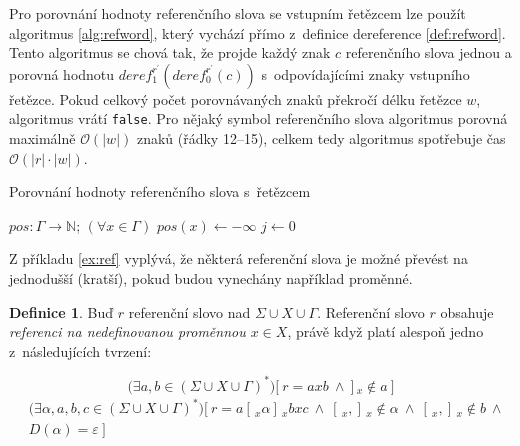 \documentclass[thesis=B,czech]{FITthesis}[2019/12/23]
\theoremstyle{definition}
\newtheorem{definition}{Definice}[chapter]
\begin{document}
Pro porovnání hodnoty referenčního slova se vstupním řetězcem lze použít algoritmus \ref{alg:refword}, který vychází přímo z~definice dereference \ref{def:refword}. Tento algoritmus se chová tak, že projde každý znak $c$ referenčního slova jednou a porovná hodnotu $deref_1^{r^\prime}  \left( deref_0^{r^\prime}  \left( c \right) \right)$ s~odpovídajícími znaky vstupního řetězce. Pokud celkový počet porovnávaných znaků překročí délku řetězce $w$, algoritmus vrátí \texttt{false}. Pro nějaký symbol referenčního slova algoritmus porovná maximálně $\mathcal{O}(|w|)$ znaků (řádky 12--15), celkem tedy algoritmus spotřebuje čas  $\mathcal{O}(|r|\cdot|w|)$. 

\begin{algorithm}
		
  \caption{Porovnání hodnoty referenčního slova s~řetězcem}\label{alg:refword}
	\DontPrintSemicolon
    $pos : \Gamma \rightarrow \mathbb{N}$; $(\forall x \in \Gamma)$ $pos(x) \gets -\infty$\;
    $j \gets 0$

  
\end{algorithm}


Z příkladu \ref{ex:ref} vyplývá, že některá referenční slova je možné převést na jednodušší (kratší), pokud budou vynechány například  proměnné. 

\begin{definition}
Buď $r$ referenční slovo nad ${\Sigma \cup X \cup \Gamma}$. Referenční slovo $r$ obsahuje \emph{referenci na nedefinovanou proměnnou $x \in X$}, právě když platí alespoň jedno z~následujících tvrzení:

	\begin{equation}\label{eq:ref1}\bigg (\exists  a, b \in \left(\Sigma \cup X \cup \Gamma\right)^\ast\bigg) \bigg [ \ r = a x b \ \wedge \ ]\,_x \notin a \ \bigg ]\end{equation}
	\begin{equation}\begin{split}\label{eq:ref2}&\bigg(\exists  \alpha, a, b, c \in \left(\Sigma \cup X \cup \Gamma\right)^\ast\bigg) \bigg [ \ r = a [\,_x \alpha  ]\,_x b x c \ \wedge \ [\,_x, ]\,_x \notin \alpha  \ \wedge \ [\,_x ,  ]\,_x \notin b \ \wedge \\&D \left( \alpha \right) = \varepsilon \ \bigg ] \end{split}\end{equation}
\end{definition}
\end{document}
